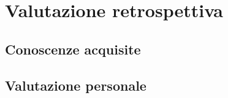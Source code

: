 \chapter{Valutazione retrospettiva}
\label{chap:conclusioni}
    \section{Conoscenze acquisite}
    \section{Valutazione personale}





\newpage